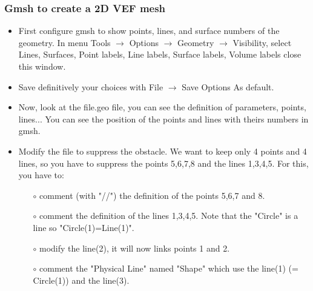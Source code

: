 \documentclass[10pt]{beamer}
\begin{document}
\begin{frame}
\frametitle{Gmsh to create a 2D VEF mesh}
\begin{block}{}

\begin{itemize}
\item First configure gmsh to show points, lines, and surface numbers of the geometry. In menu Tools $\rightarrow$ Options $\rightarrow$ Geometry $\rightarrow$ Visibility, select Lines, Surfaces, Point labels, Line labels, Surface labels, Volume labels close this window. 
\item Save definitively your choices with File $\rightarrow$ Save Options As default.

\item Now, look at the file.geo file, you can see the definition of parameters, points, lines... You can see the position of the points and lines with theirs numbers in gmsh.

\item Modify the file to suppress the obstacle. We want to keep only 4 points and 4 lines, so you have to suppress the points 5,6,7,8 and the lines 1,3,4,5. For this, you have to:
    \begin{itemize}
    \item [$\circ$] comment (with "//") the definition of the points 5,6,7 and 8.
    \item [$\circ$] comment the definition of the lines 1,3,4,5. Note that the "Circle" is a line so "Circle(1)=Line(1)".
    \item [$\circ$] modify the line(2), it will now links points 1 and 2.
    \item [$\circ$] comment the "Physical Line" named "Shape" which use the line(1) (= Circle(1)) and the line(3).
    \end{itemize}
\end{itemize}

\end{block}
\end{frame}
\end{document}
